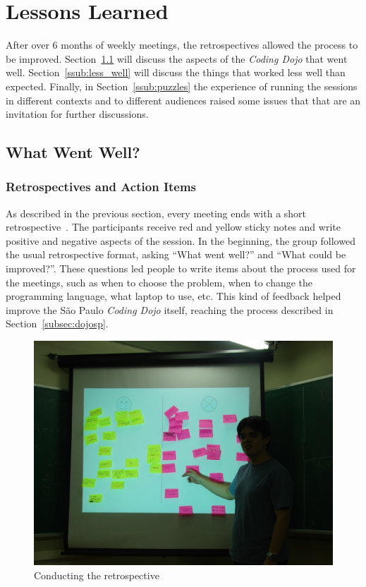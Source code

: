 \section{Lessons Learned}\label{sec:lessons_learned}

After over 6 months of weekly meetings, the retrospectives allowed the
process to be improved. Section~\ref{ssub:well} will discuss the
aspects of the \emph{Coding Dojo} that went
well. Section~\ref{ssub:less_well} will discuss the things that worked
less well than expected. Finally, in Section~\ref{ssub:puzzles} the
experience of running the sessions in different contexts and to
different audiences raised some issues that that are an invitation for
further discussions.

\subsection{What Went Well?}\label{ssub:well}

\subsubsection{Retrospectives and Action Items}

As described in the previous section, every meeting ends with a
short retrospective~\cite{Retro}. The participants receive red and yellow sticky
notes and write positive and negative aspects of the session. In the
beginning, the group followed the usual retrospective format,
asking ``What went well?'' and ``What could be improved?''.
These questions led people to write items about the process used for
the meetings, such as when to choose the problem, when to change the
programming language, what laptop to use, etc. This kind of feedback
helped improve the São Paulo \emph{Coding Dojo} itself, reaching the
process described in Section~\ref{subsec:dojosp}.

\begin{figure}[htp]
\centering
\includegraphics[width=\columnwidth]{retrospective}
\caption{Conducting the retrospective}\label{fig:retrospective}
\end{figure}


